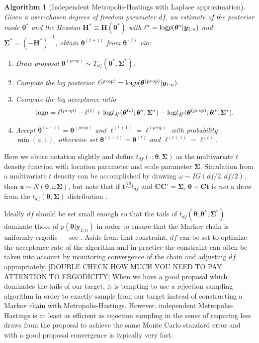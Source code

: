 \documentclass[12pt]{article}
\def\log{\hbox{log}}
\newtheorem{alg}{Algorithm}
\begin{document}
\begin{alg}[Independent Metropolis-Hastings with Laplace approximation]\label{alg:IM1}
Given a user-chosen degrees of freedom parameter $df$, an estimate of the posterior mode $\bm{\theta}^*$ and the Hessian $\bm{H}^* \equiv \bm{H}(\bm{\theta}^*)$ with $\ell^* = \log p(\bm{\theta}^*|\bm{y}_{1:n})$ and $\bm{\Sigma}^* = (-\bm{H}^*)^{-1}$, obtain $\bm{\theta}^{(t+1)}$ from $\bm{\theta}^{(t)}$ via:
\begin{enumerate}
\item Draw proposal $\bm{\theta}^{(prop)} \sim T_{df}(\bm{\theta}^*, \bm{\Sigma}^*)$.
\item Compute the log posterior $\ell^{(prop)} = \log p(\bm{\theta}^{(prop)}|\bm{y}_{1:n})$.
\item Compute the log acceptance ratio 
\begin{align*}
\log a = \ell^{(prop)} - \ell^{(t)} + \log t_{df}(\bm{\theta}^{(t)}; \bm{\theta}^*, \bm{\Sigma}^*) - \log t_{df}(\bm{\theta}^{(prop)}; \bm{\theta}^*, \bm{\Sigma}^*).
\end{align*}

\item Accept $\bm{\theta}^{(t+1)} = \bm{\theta}^{(prop)}$ and $\ell^{(t+1)} = \ell^{(prop)}$ with probability $\min(a, 1)$, otherwise set $\bm{\theta}^{(t+1)} = \bm{\theta}^{(t)}$ and $\ell^{(t+1)} = \ell^{(t)}$.
\end{enumerate}
\end{alg}
\noindent Here we abuse notation slightly and define $t_{df}(\cdot;\bm{\theta}, \bm{\Sigma})$ as the multivariate $t$ density function with location parameter and scale parameter $\bm{\Sigma}$. Simulation from a multivariate $t$ density can be accomplished by drawing $\omega\sim IG(df/2, df/2)$, then $\bm{x} \sim N(\bm{\theta}, \omega\bm{\Sigma})$, but note that if $\bm{t} \stackrel{iid}{\sim} t_{df}$ and $\bm{C}\bm{C}' = \bm{\Sigma}$, $\bm{\theta} + \bm{C}\bm{t}$ is {\it not} a draw from the $t_{df}(\bm{\theta},\bm{\Sigma})$ distribution \citep{hofert2013sampling}. 

Ideally $df$ should be set small enough so that the tails of $t_{df}(\bm{\theta};\bm{\theta}^*,\bm{\Sigma}^*)$ dominate those of $p(\bm{\theta}|\bm{y}_{1:n})$ in order to ensure that the Markov chain is uniformly ergodic --- see \citet[Theorem~7.8]{robert2013monte}. Aside from that constraint, $df$ can be set to optimize the acceptance rate of the algorithm and in practice the constraint can often be taken into account by monitoring convergence of the chain and adjusting $df$ appropriately. [DOUBLE CHECK HOW MUCH YOU NEED TO PAY ATTENTION TO ERGODICITY] When we have a good proposal which dominates the tails of our target, it is tempting to use a rejection sampling algorithm in order to exactly sample from our target instead of constructing a Markov chain with Metropolis-Hastings. However, independent Metropolis-Hastings is at least as efficient as rejection sampling in the sense of requiring less draws from the proposal to achieve the same Monte Carlo standard error \citep{liu1996metropolized} and with a good proposal convergence is typically very fast.
\end{document}
